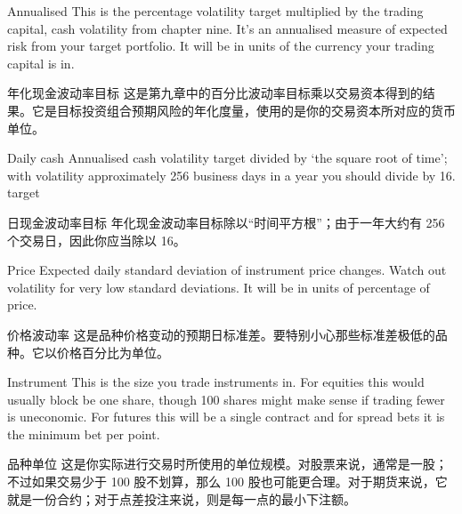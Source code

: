 \bipairgap

\begin{englishblock} Annualised This is the percentage volatility target multiplied by the trading capital, cash volatility from chapter nine. It's an annualised measure of expected risk from your target portfolio. It will be in units of the currency your trading capital is in. \end{englishblock}

\begin{chineseblock}年化现金波动率目标 这是第九章中的百分比波动率目标乘以交易资本得到的结果。它是目标投资组合预期风险的年化度量，使用的是你的交易资本所对应的货币单位。\end{chineseblock}

\bipairgap

\begin{englishblock} Daily cash Annualised cash volatility target divided by ‘the square root of time'; with volatility approximately 256 business days in a year you should divide by 16. target \end{englishblock}

\begin{chineseblock}日现金波动率目标 年化现金波动率目标除以“时间平方根”；由于一年大约有 256 个交易日，因此你应当除以 16。 \end{chineseblock}

\bipairgap

\begin{englishblock} Price Expected daily standard deviation of instrument price changes. Watch out volatility for very low standard deviations. It will be in units of percentage of price. \end{englishblock}

\begin{chineseblock}价格波动率 这是品种价格变动的预期日标准差。要特别小心那些标准差极低的品种。它以价格百分比为单位。\end{chineseblock}

\bipairgap

\begin{englishblock} Instrument This is the size you trade instruments in. For equities this would usually block be one share, though 100 shares might make sense if trading fewer is uneconomic. For futures this will be a single contract and for spread bets it is the minimum bet per point. \end{englishblock}

\begin{chineseblock}品种单位 这是你实际进行交易时所使用的单位规模。对股票来说，通常是一股；不过如果交易少于 100 股不划算，那么 100 股也可能更合理。对于期货来说，它就是一份合约；对于点差投注来说，则是每一点的最小下注额。\end{chineseblock}

